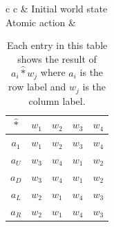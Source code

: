 \begin{table}[H]
    \centering
    \begin{tabular}{c c}
        & Initial world state \\
        Atomic action & \begin{tabular}{c|c c c c}
            $\hat{\ast}$ & $w_{1}$ & $w_{2}$ & $w_{3}$ & $w_{4}$ \\
            \hline
            $a_{1}$ & $w_{1}$ & $w_{2}$ & $w_{3}$ & $w_{4}$ \\
            $a_{U}$ & $w_{3}$ & $w_{4}$ & $w_{1}$ & $w_{2}$ \\
            $a_{D}$ & $w_{3}$ & $w_{4}$ & $w_{1}$ & $w_{2}$ \\
            $a_{L}$ & $w_{2}$ & $w_{1}$ & $w_{4}$ & $w_{3}$ \\
            $a_{R}$ & $w_{2}$ & $w_{1}$ & $w_{4}$ & $w_{3}$ \\
        \end{tabular} \\
    \end{tabular}
    \caption{
    Each entry in this table shows the result of $a_{i} \hat{\ast} w_{j}$ where $a_{i}$ is the row label and $w_{j}$ is the column label.
    }
    \label{tab:2x2_gridworld_atomic_action_effect_operator}
\end{table}

